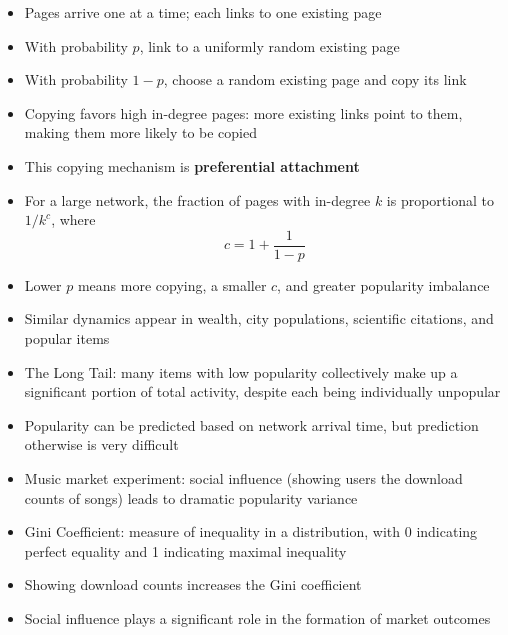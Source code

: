 \begin{itemize}
    \item Pages arrive one at a time; each links to one existing page
    \item With probability \(p\), link to a uniformly random existing page
    \item With probability \(1-p\), choose a random existing page and copy its link
    \item Copying favors high in-degree pages: more existing links point to them, making them more likely to be copied
    \item This copying mechanism is \textbf{preferential attachment}
    \item For a large network, the fraction of pages with in-degree \(k\) is proportional to \(1/k^c\), where
          \begin{equation}
              c = 1 + \frac{1}{1-p}
          \end{equation}
    \item Lower \(p\) means more copying, a smaller \(c\), and greater popularity imbalance
    \item Similar dynamics appear in wealth, city populations, scientific citations, and popular items
    \item The Long Tail: many items with low popularity collectively make up a significant portion of total activity, despite each being individually unpopular
    \item Popularity can be predicted based on network arrival time, but prediction otherwise is very difficult
    \item Music market experiment: social influence (showing users the download counts of songs) leads to dramatic popularity variance
    \item Gini Coefficient: measure of inequality in a distribution, with 0 indicating perfect equality and 1 indicating maximal inequality
    \item Showing download counts increases the Gini coefficient
    \item Social influence plays a significant role in the formation of market outcomes
\end{itemize}